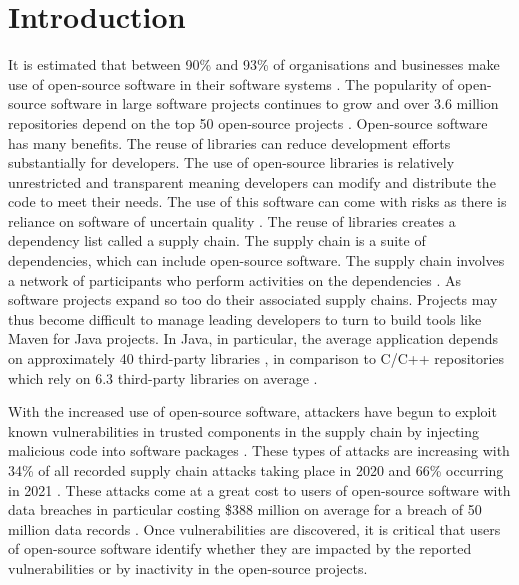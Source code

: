 \documentclass[conference]{IEEEtran}
\begin{document}
\section{Introduction}
It is estimated that between 90\% and 93\% of organisations and businesses make use of open-source software in their software systems \cite{zajdel_open_2022}. The popularity of open-source software in large software projects continues to grow and over 3.6 million repositories depend on the top 50 open-source projects \cite{subramanian_empirical_2020}. Open-source software has many benefits. The reuse of libraries can reduce development efforts substantially for developers. The use of open-source libraries is relatively unrestricted and transparent meaning developers can modify and distribute the code to meet their needs. The use of this software can come with risks as there is reliance on software of uncertain quality \cite{zajdel_open_2022}. The reuse of libraries creates a dependency list called a supply chain. The supply chain is a suite of dependencies, which can include open-source software. The supply chain involves a network of participants who perform activities on the dependencies \cite{k_singi_trusted_2019}. As software projects expand so too do their associated supply chains. Projects may thus become difficult to manage leading developers to turn to build tools like Maven for Java projects. In Java, in particular, the average application depends on approximately 40 third-party libraries \cite{a_m_mir_effect_2023}, in comparison to C/C++ repositories which rely on 6.3 third-party libraries on average \cite{tang_towards_2023}.

With the increased use of open-source software, attackers have begun to exploit known vulnerabilities in trusted components in the supply chain by injecting malicious code into software packages \cite{ohm_backstabbers_2020}. These types of attacks are increasing with 34\% of all recorded supply chain attacks taking place in 2020 and 66\% occurring in 2021 \cite{m_z_malik_protection_2023}. These attacks come at a great cost to users of open-source software with data breaches in particular costing \$388 million on average for a breach of 50 million data records \cite{x_wang_feasibility_2021}. Once vulnerabilities are discovered, it is critical that users of open-source software identify whether they are impacted by the reported vulnerabilities or by inactivity in the open-source projects. 
\end{document}
